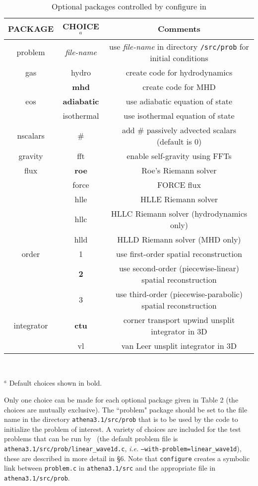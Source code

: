 \begin{table}[ht]
\caption{Optional packages controlled by configure in \ath}
\begin{center}
\begin{tabular}{|c|c|c|} \hline \hline
PACKAGE & CHOICE$^{a}$ & Comments \\ \hline
problem & {\it file-name} & use {\it file-name} in directory {\tt /src/prob} for initial conditions \\ \hline
gas    & hydro  & create code for hydrodynamics \\
       & {\bf mhd}    & create code for MHD \\ \hline
eos    & {\bf adiabatic} & use adiabatic equation of state \\
       & isothermal & use isothermal equation of state \\ \hline
nscalars & \# & add \# passively advected scalars (default is 0) \\ \hline
gravity & fft & enable self-gravity using FFTs \\ \hline
flux & {\bf roe} & Roe's Riemann solver \\
     & force & FORCE flux \\
     & hlle & HLLE Riemann solver \\
     & hllc & HLLC Riemann solver (hydrodynamics only) \\
     & hlld & HLLD Riemann solver (MHD only) \\ \hline
order & 1 & use first-order spatial reconstruction \\
      & {\bf 2} & use second-order (piecewise-linear) spatial reconstruction \\
      & 3 & use third-order (piecewise-parabolic) spatial reconstruction \\ \hline
integrator & {\bf ctu} & corner transport upwind unsplit integrator in 3D \\
           & vl & van Leer unsplit integrator in 3D \\
\hline
\end{tabular} \\
\end{center}
$^{a}$ Default choices shown in bold.
\end{table}

Only one choice can be made for each optional package given in Table 2
(the choices are mutually exclusive).  The ``problem" package should be
set to the file name in the directory {\tt athena3.1/src/prob} that is
to be used by the code to initialize the problem of interest.  A variety
of choices are included for the test problems that can be run by \ath\
(the default problem file is {\tt athena3.1/src/prob/linear\_wave1d.c},
{\it i.e.} {\tt --with-problem=linear\_wave1d}), these are described in
more detail in \S 6.  Note that {\tt configure} creates a symbolic link
between {\tt problem.c} in {\tt athena3.1/src} and the appropriate file
in {\tt athena3.1/src/prob}.

